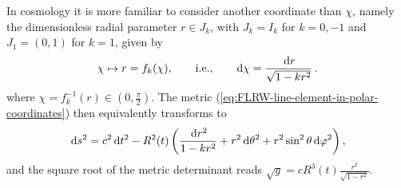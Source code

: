 \begin{bem}
\label{Bemerkung 3.7}%
In cosmology it is more familiar to consider another coordinate than $\chi$, namely the dimensionless radial parameter $r \in J_k$, with $J_k = I_k$ for $k=0,-1$ and $J_1 = (0,1)$ for $k=1$, given by
\begin{equation}
	\chi \mapsto r = f_k(\chi),
	\label{eq:FLRW-r} %
	\qquad \mbox{i.e.,} \qquad
	\D\chi = \frac{\D r}{\sqrt{1 - kr^2}}\,.
\end{equation}
where $	\chi = f_k^{-1}(r) \in (0, \frac{\pi}{2})$.
The metric (\ref{eq:FLRW-line-element-in-polar-coordinates}) then equivalently transforms to
\begin{equation}
	\D s^2 = c^2 \D t^2 - R^2(t) 
	\left( \frac{\D r^2}{1 - kr^2} + r^2 \D \theta^2 + r^2 \sin^2 \theta \D \varphi^2 \right)
	,
	\label{eq:FLRW-line-element} %
\end{equation}
and the square root of the metric determinant reads $\sqrt{g} = c R^3(t) \frac{r^2}{\sqrt{1 - r^2}}$. 
\end{bem}

